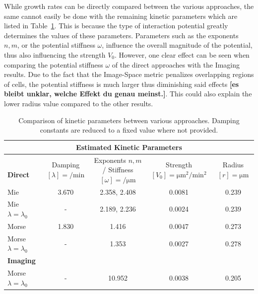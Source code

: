 \documentclass[10pt,letterpaper]{article}
\begin{document}
While growth rates can be directly compared between the various approaches, the same cannot easily
be done with the remaining kinetic parameters which are listed in
Table~\ref{tab:comparison-kinetic-parameters}.
This is because the type of interaction potential greatly determines the values of these parameters.
Parameters such as the exponents $n,m$, or the potential stiffness $\omega$, influence the overall
magnitude of the potential, thus also influencing the strength $V_0$.
However, one clear effect can be seen when comparing the potential stiffness $\omega$ of the direct
approaches with the Imaging results.
Due to the fact that the Image-Space metric penalizes overlapping regions of cells, the potential
stiffness is much larger thus diminishing said effects
{\bf [es bleibt unklar, welche Effekt du genau meinst.]}.
This could also explain the lower radius value compared to the other results.

\begin{table}[H]
    \centering
    \begin{tabular}{l c c c c}
        \multicolumn{5}{c}{Estimated Kinetic Parameters}\\
        \toprule
        \makecell[l]{\\\textbf{Direct}}
            & \makecell{Damping\\$[\lambda]=\unit{\per\minute}$}
            & \makecell{Exponents $n,m$/\\Stiffness $[\omega]=\unit{\per\micro\metre}$}
            & \makecell{Strength\\$[V_0]=\unit{\micro\metre^2\per\minute^2}$}
            & \makecell{Radius\\$[r]=\unit{\micro\metre}$}\\
        \midrule
        Mie                         & 3.670 & 2.358, 2.408 & 0.0081 & 0.239\\
        Mie $\lambda=\lambda_0$     & -     & 2.189, 2.236 & 0.0024 & 0.239\\
        Morse                       & 1.830 & 1.416 & 0.0047 & 0.273\\
        Morse $\lambda=\lambda_0$   & -     & 1.353 & 0.0027 & 0.278\\
        \textbf{Imaging}\\
        \midrule
        Morse $\lambda=\lambda_0$   & - & 10.952 & 0.0038 & 0.205\\
        \bottomrule
    \end{tabular}
    \caption{
        Comparison of kinetic parameters between various approaches.
        Damping constants are reduced to a fixed value where not provided.
    }
    \label{tab:comparison-kinetic-parameters}
\end{table}
\end{document}
